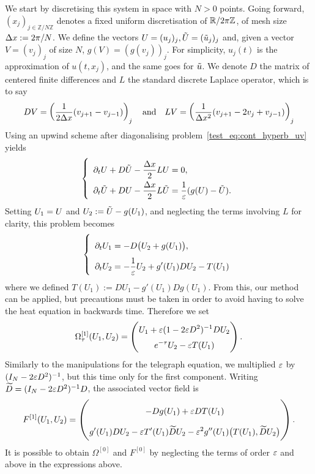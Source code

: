 We start by discretising this system in space with $N > 0$ points. 
Going forward, $(x_j)_{j \in \mathbb{Z}/N\mathbb{Z}}$ denotes a fixed uniform discretisation of $\mathbb{R}/2\pi \mathbb Z$, of mesh size $\Delta x := 2\pi/N$. 
We define the vectors $U = (u_j)_j, \tilde{U} = (\tilde{u}_j)_j$ 
and, given a vector $V = (v_j)_j$ of size $N$, $g(V) = (g(v_j))_j$. 
For simplicity, $u_j(t)$ is the approximation of $u(t,x_j)$, and the same goes for $\tilde{u}$. 
%
We denote $D$ the matrix of centered finite differences and $L$ the standard discrete Laplace operator, which is to say 
$$D V = \left( \frac{1}{2\Delta x} (v_{j+1} - v_{j-1}) \right)_j 
\quad\text{and}\quad
L V = \left( \frac{1}{\Delta x^2} ( v_{j+1} - 2 v_j + v_{j-1}) \right)_j $$
Using an upwind scheme after diagonalising problem~\eqref{test_eq:cont_hyperb_uv} yields 
\begin{equation} \label{test_eq:disc_hyperb_uv}
\renewcommand{\arraystretch}{2}
\left\{ \begin{array}{l} \displaystyle
\dpt U + D\rlxdisc - \frac{\Dx}{2} LU = 0 , 
\\ \displaystyle
\dpt \rlxdisc + DU - \frac{\Dx}{2} L\rlxdisc  = \frac{1}{\eps}(g(U) - \rlxdisc ) .
\end{array} \right .
\end{equation}
%
Setting $U_1 = U$ and $U_2 := \tilde{U} - g(U_1)$, and neglecting the terms involving $L$ for clarity, 
this problem becomes 
\begin{equation} \label{test_pb:conserv} 
\renewcommand{\arraystretch}{2}
\left\{ \begin{array}{l} \displaystyle
\dpt \xvar =
- D\big( \zvar + g(\xvar) \big) , %
\\ \displaystyle
\dpt \zvar = 
-\inveps \zvar + g'(\xvar) D\zvar - T(\xvar) %
\end{array} \right . 
\end{equation} 
where we defined 
$ T(U_1) := DU_1 - g'(U_1) D g(U_1) . %
$
From this, our method can be applied, but precautions must be taken 
in order to avoid having to solve the heat equation in backwards time. 
Therefore we set 
$$ \renewcommand{\arraystretch}{1.5}
\Omega^{[1]}_{\tau}(\xvar,\zvar) = \among{ \displaystyle
\xvar + \eps (1 - 2\eps D^2)^{-1} D\zvar
}{ \displaystyle
e^{-\tau} \zvar - \eps T(\xvar)
} .
$$
Similarly to the manipulations for the telegraph equation, 
we multiplied $\varepsilon$ by $(I_N - 2 \varepsilon D^2)^{-1}$, 
but this time only for the first component. 
Writing $\widetilde{D} = (I_N - 2 \varepsilon D^2)^{-1} D$, 
the associated vector field is 
$$ \renewcommand{\arraystretch}{2}
F^{[1]}(\xvar, \zvar) = \among{ \displaystyle
- Dg(\xvar) + \eps D T(\xvar) %
}{\displaystyle 
g'(\xvar)D\zvar - \eps T'(\xvar)\widetilde{D}\zvar - \eps^2 g''(\xvar) \big( T(\xvar), \widetilde{D}\zvar \big)
} .
$$
It is possible to obtain $\Omega^{[0]}$ and $F^{[0]}$ 
by neglecting the terms of order $\varepsilon$ and above in the expressions above. 

